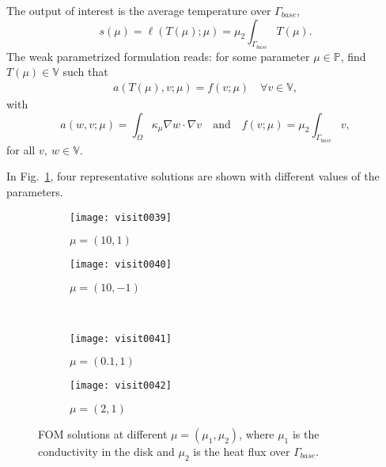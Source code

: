 The output of interest is the average temperature over $\Gamma_{base}$,
%
\begin{equation}
   s(\mu) = \ell(T(\mu);\mu) = \mu_2 \int_{\Gamma_{base}} T(\mu).
\end{equation}
%
The weak parametrized formulation reads: for
some parameter $\mu \in \mathbb{P}$, find $T(\mu) \in \mathbb{V}$ such that
%
\begin{align}
   a(T(\mu), v; \mu) = f(v;\mu)\quad \forall v \in \mathbb{V},
\end{align}
%
with
\begin{equation}
   a(w, v; \mu) = \int_{\Omega} \kappa_\mu \nabla w \cdot \nabla
   v \quad \text{and} \quad f(v; \mu) = \mu_2 \int_{\Gamma_{base}} v,
\end{equation} for all $v,~w \in \mathbb{V}$.

In Fig.~\ref{fig:hc_fom}, four representative solutions are shown with different
values of the parameters.
\begin{figure}[!h]
     \centering
     \begin{subfigure}[b]{0.45\textwidth}
         \centering
         \texttt{[image: visit0039]}
         \caption{$\mu= (10, 1)$}
     \end{subfigure}
     \hfill
     \begin{subfigure}[b]{0.45\textwidth}
         \centering
         \texttt{[image: visit0040]}
         \caption{$\mu = (10, -1)$}
     \end{subfigure}\\
     \begin{subfigure}[b]{0.45\textwidth}
         \centering
         \texttt{[image: visit0041]}
         \caption{$\mu = (0.1, 1)$}
     \end{subfigure}
     \hfill
     \begin{subfigure}[b]{0.45\textwidth}
         \centering
         \texttt{[image: visit0042]}
         \caption{$\mu = (2, 1)$}
     \end{subfigure}
     \caption{FOM solutions at different $\mu = (\mu_1,\mu_2)$, where $\mu_1$
     is the conductivity in the disk and $\mu_2$ is the heat flux over
     $\Gamma_{base}$.}
      \label{fig:hc_fom}
\end{figure}

